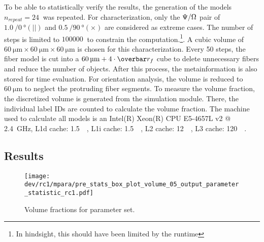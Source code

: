 %
To be able to statistically verify the results, the generation of the models $n_{\mathit{repeat}} = \SI{24}{}$ was repeated.
For characterization, only the $\textnormal{$\Psi$}/\textnormal{$\Omega$}$ pair of $\SI{1.0}{}/\SI{0}{\degree}(||)$ and $\SI{0.5}{}/\SI{90}{\degree}(\times)$ are considered as extreme cases.
The number of steps is limited to $\SI{100000}{}$ to constrain the computation.\footnote{In hindsight, this should have been limited by the runtime}.
A cubic volume of $\SI{60}{\micro\meter} \times \SI{60}{\micro\meter} \times \SI{60}{\micro\meter}$ is chosen for this characterization.
Every 50 steps, the fiber model is cut into a $\SI{60}{\micro\meter}+4 \cdot \fiberRadiusMean$ cube to delete unnecessary fibers and reduce the number of objects.
After this process, the metainformation is also stored for time evaluation.
For orientation analysis, the volume is reduced to $\SI{60}{\micro\meter}$ to neglect the protruding fiber segments.
To measure the volume fraction, the discretized volume is generated from the simulation module.
There, the individual label IDs are counted to calculate the volume fraction.
The machine used to calculate all models is an
Intel(R) Xeon(R) CPU E5-4657L v2 @ \SI{2.4}{\giga\hertz}, L1d cache: \SI{1.5}{\mega\byte}, L1i cache: \SI{1.5}{\mega\byte}, L2 cache: \SI{12}{\mega\byte}, L3 cache: \SI{120}{\mega\byte}.
%
%
%
\subsection{Results}
%
\begin{figure}[t]
\centering
\texttt{[image: dev/rc1/mpara/pre\_stats\_box\_plot\_volume\_05\_output\_parameter\_statistic\_rc1.pdf]}
\caption[Volume fraction]{Volume fractions for parameter set.}
\label{fig:psbp1}
\end{figure}
%
